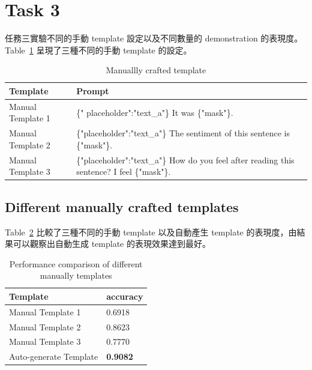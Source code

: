 \documentclass[a4paper,12pt]{article}   %
\begin{document}
\section{Task 3}

	任務三實驗不同的手動 template 設定以及不同數量的 demonstration 的表現度。Table\ \ref{table:manually_crafted_template} 呈現了三種不同的手動 template 的設定。
	
\begin{table}[htb]
	\centering	
	
    \caption{Manuallly crafted template}
    \vspace{0.15\baselineskip}
    \footnotesize
    \begin{tabularx}{1.15\textwidth}{@{}l|l@{}}
		\toprule
		\textbf{Template} & \textbf{Prompt} \\
		\midrule
		Manual Template 1   &  \{" placeholder":"text\_a"\} It was \{"mask"\}. \\
		Manual Template 2   & \{"placeholder":"text\_a"\} The sentiment of this sentence is \{"mask"\}. \\
		Manual Template 3   & \{"placeholder":"text\_a"\} How do you feel after reading this sentence? I feel \{"mask"\}.  \\  
		\bottomrule
	\end{tabularx}
	\label{table:manually_crafted_template}
    \vspace{0.1\baselineskip}
\end{table}

\subsection{Different manually crafted templates}
	
	Table\ \ref{table:different_manually_templates} 比較了三種不同的手動 template 以及自動產生 template 的表現度，由結果可以觀察出自動生成 template 的表現效果達到最好。
	
\vspace{-5mm}
\begin{table}[htb]
	\centering	
	\normalsize
    \caption{Performance comparison of different manually templates}
    \vspace{0.15\baselineskip}
    \begin{tabularx}{1\textwidth}{@{}XX@{}}
		\toprule
		\textbf{Template} & \textbf{accuracy} \\
		\midrule
		Manual Template 1       &  0.6918  \\ 
		Manual Template 2       &  0.8623  \\
		Manual Template 3       &  0.7770  \\ 
		Auto-generate Template  & \textbf{0.9082} \\
		\bottomrule
	\end{tabularx}
	\label{table:different_manually_templates}
    \vspace{0.15\baselineskip}
\end{table}
\end{document}
